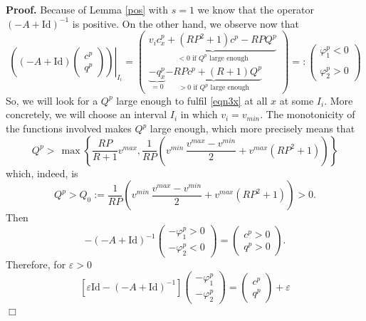 \documentclass[a4paper]{article}
\def\Id{\rm{Id}}
\def\Id{\mathrm{Id}}
\numberwithin{equation}{section}
\newenvironment{pf}{\vspace{0.5em}\noindent\textbf{Proof.} }{\quad \hfill $\Box$ \\ \vspace{0.2em}\\}
\begin{document}
\begin{pf}
Because of Lemma \ref{pos} with $s=1$ we know that the operator $(-A+\Id)^{-1}$ is positive. On the other hand, we observe now that
\begin{equation}\label{eqn3x}
\left.\left((-A+\Id)\begin{pmatrix} c^p\\q^p\end{pmatrix}\right)\right|_{I_i}=
\left( \begin{array}{cc}
\underbrace{v_i c^p_x+(RP^2+1)c^p-RPQ^p}_{ < 0\text{ if } Q^p \text{ large enough}}\\
\underbrace{-q^p_x}_{=0}\underbrace{-RPc^p+(R+1)Q^p}_{ > 0 \text{ if }Q^p \text{ large enough}}
\end{array}
\right) =:
\left( \begin{array}{ll} \varphi^p_1{ <0}\\ \\ \varphi^p_2{ >0}\end{array}\right)
\end{equation}
So, we will look for a $Q^p$ large enough to fulfil \eqref{eqn3x} at all $x$ at some $I_i$. More concretely, we will choose an interval $I_i$ in which $v_i=v_{min}$. The monotonicity of the functions involved makes $Q^p$ large enough, which more precisely means that
$$Q^p > \, \max\left\{ \dfrac{RP}{R+1} v^{max}, \dfrac{1 }{RP}\left(v^{min} \,\dfrac{v^{max}-v^{min}}{2}+v^{max}\left(RP^2+1\right)  \right) \right\}$$
which, indeed, is
$$ Q^p > Q_0:=\dfrac{1 }{RP}\left(v^{min} \,\dfrac{v^{max}-v^{min}}{2}+v^{max}\left(RP^2+1\right)  \right)  >0.
 $$
Then
\begin{equation*}%
-(-A+\Id)^{-1}\left( \begin{array}{ll} -\varphi^p_1 > 0\\-\varphi^p_2 < 0\end{array}\right)=\begin{pmatrix} c^p>0\\q^p>0\end{pmatrix}.
\end{equation*}
Therefore, for $\varepsilon>0$
\begin{equation}\label{eqn5x}
[\varepsilon\Id-(-A+\Id)^{-1}]\left( \begin{array}{ll} -\varphi^p_1\\-\varphi^p_2\end{array}\right)=
\begin{pmatrix} c^p\\q^p\end{pmatrix}+\varepsilon

\end{equation}
\end{pf}
\end{document}
